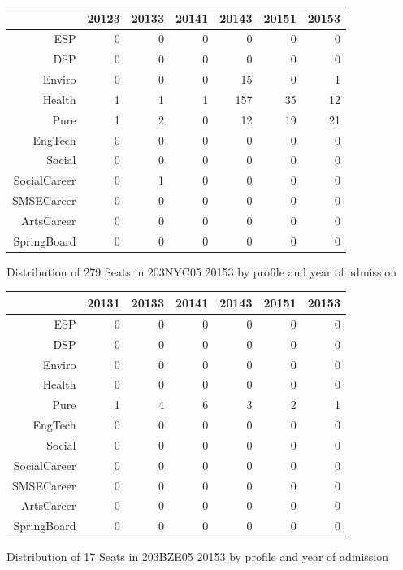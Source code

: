\documentclass{article}\usepackage[]{graphicx}\usepackage[]{color}
\makeatletter
\newenvironment{kframe}{%
 \def\at@end@of@kframe{}%
 \ifinner\ifhmode%
  \def\at@end@of@kframe{\end{minipage}}%
  \begin{minipage}{\columnwidth}%
 \fi\fi%
 \def\FrameCommand##1{\hskip\@totalleftmargin \hskip-\fboxsep
 \colorbox{shadecolor}{##1}\hskip-\fboxsep
     \hskip-\linewidth \hskip-\@totalleftmargin \hskip\columnwidth}%
 \MakeFramed {\advance\hsize-\width
   \@totalleftmargin\z@ \linewidth\hsize
   \@setminipage}}%
 {\par\unskip\endMakeFramed%
 \at@end@of@kframe}
\makeatother
\begin{document}
\begin{figure}[H]
\centering
\begin{tabular}{rrrrrrr}
  \hline
 & 20123 & 20133 & 20141 & 20143 & 20151 & 20153 \\ 
  \hline
ESP &   0 &   0 &   0 &   0 &   0 &   0 \\ 
  DSP &   0 &   0 &   0 &   0 &   0 &   0 \\ 
  Enviro &   0 &   0 &   0 &  15 &   0 &   1 \\ 
  Health &   1 &   1 &   1 & 157 &  35 &  12 \\ 
  Pure &   1 &   2 &   0 &  12 &  19 &  21 \\ 
  EngTech &   0 &   0 &   0 &   0 &   0 &   0 \\ 
  Social &   0 &   0 &   0 &   0 &   0 &   0 \\ 
  SocialCareer &   0 &   1 &   0 &   0 &   0 &   0 \\ 
  SMSECareer &   0 &   0 &   0 &   0 &   0 &   0 \\ 
  ArtsCareer &   0 &   0 &   0 &   0 &   0 &   0 \\ 
  SpringBoard &   0 &   0 &   0 &   0 &   0 &   0 \\ 
   \hline
\end{tabular}
\caption{Distribution of 279 Seats in 203NYC05 20153 by profile and year of admission} 
\end{figure}
\begin{kframe}

{\ttfamily\noindent\bfseries\color{errorcolor}{\#\# Error in characters | factors: operations are possible only for numeric, logical or complex types}}\end{kframe}%
\begin{figure}[H]
\centering
\begin{tabular}{rrrrrrr}
  \hline
 & 20131 & 20133 & 20141 & 20143 & 20151 & 20153 \\ 
  \hline
ESP &   0 &   0 &   0 &   0 &   0 &   0 \\ 
  DSP &   0 &   0 &   0 &   0 &   0 &   0 \\ 
  Enviro &   0 &   0 &   0 &   0 &   0 &   0 \\ 
  Health &   0 &   0 &   0 &   0 &   0 &   0 \\ 
  Pure &   1 &   4 &   6 &   3 &   2 &   1 \\ 
  EngTech &   0 &   0 &   0 &   0 &   0 &   0 \\ 
  Social &   0 &   0 &   0 &   0 &   0 &   0 \\ 
  SocialCareer &   0 &   0 &   0 &   0 &   0 &   0 \\ 
  SMSECareer &   0 &   0 &   0 &   0 &   0 &   0 \\ 
  ArtsCareer &   0 &   0 &   0 &   0 &   0 &   0 \\ 
  SpringBoard &   0 &   0 &   0 &   0 &   0 &   0 \\ 
   \hline
\end{tabular}
\caption{Distribution of 17 Seats in 203BZE05 20153 by profile and year of admission} 
\end{figure}
\end{document}
